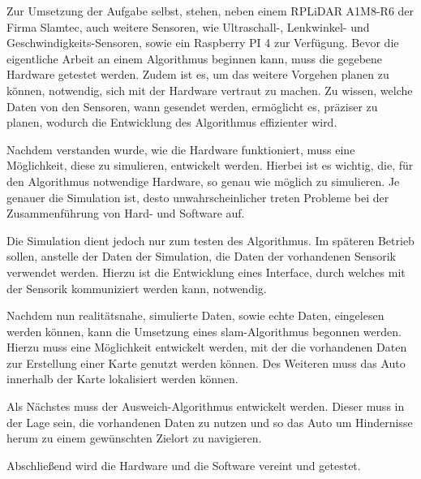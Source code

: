 Zur Umsetzung der Aufgabe selbst, stehen, neben einem RPLiDAR A1M8-R6 der Firma Slamtec, auch weitere Sensoren, 
wie Ultraschall-, Lenkwinkel- und Geschwindigkeits-Sensoren, sowie ein Raspberry PI 4 zur Verfügung.
Bevor die eigentliche Arbeit an einem Algorithmus beginnen kann, muss die gegebene Hardware getestet werden. 
Zudem ist es, um das weitere Vorgehen planen zu können, notwendig, sich mit der Hardware vertraut zu machen. 
Zu wissen, welche Daten von den Sensoren, wann gesendet werden, ermöglicht es, präziser zu planen, wodurch die Entwicklung des Algorithmus effizienter wird.

Nachdem verstanden wurde, wie die Hardware funktioniert, muss eine Möglichkeit, diese zu simulieren, entwickelt werden.
Hierbei ist es wichtig, die, für den Algorithmus notwendige Hardware, so genau wie möglich zu simulieren. 
Je genauer die Simulation ist, desto unwahrscheinlicher treten Probleme bei der Zusammenführung von Hard- und Software auf.

Die Simulation dient jedoch nur zum testen des Algorithmus.
Im späteren Betrieb sollen, anstelle der Daten der Simulation, die Daten der vorhandenen Sensorik verwendet werden.
Hierzu ist die Entwicklung eines Interface, durch welches mit der Sensorik kommuniziert werden kann, notwendig.

Nachdem nun realitätsnahe, simulierte Daten, sowie echte Daten, eingelesen werden können, kann die Umsetzung eines \acf{slam}-Algorithmus begonnen werden.
Hierzu muss eine Möglichkeit entwickelt werden, mit der die vorhandenen Daten zur Erstellung einer Karte genutzt werden können.
Des Weiteren muss das Auto innerhalb der Karte lokalisiert werden können.

Als Nächstes muss der Ausweich-Algorithmus entwickelt werden.
Dieser muss in der Lage sein, die vorhandenen Daten zu nutzen und so das Auto um Hindernisse herum zu einem gewünschten Zielort zu navigieren.

Abschließend wird die Hardware und die Software vereint und getestet.

\newpage
